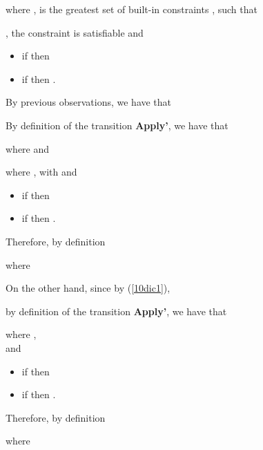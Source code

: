 \documentclass[final]{acmtrans2e}
\begin{document}
where ,
 is the greatest set of built-in constraints ,
such that

, the
constraint  is satisfiable and
\begin{itemize}
    \item if  then 
    \item if  then .
    \end{itemize}
    By previous observations, we have that
    
 By definition of the transition \textbf{Apply'}, we have that

where  and

     where
     , with
      and
\begin{itemize}
    \item if  then 
    \item if  then .
    \end{itemize}
    Therefore, by definition
    
    where
    

On the other hand, since by (\ref{10dic1}),

by definition of the transition \textbf{Apply'}, we have that


     where ,\\
      and
\begin{itemize}
    \item if  then 
    \item if  then .
    \end{itemize}
    Therefore, by definition
    
  where
\end{document}
